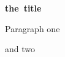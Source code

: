 \begin{examplewithcode}
\def\Header#1{\medskip
  \hbox{\bfseries #1}
  \setcounter{vcount}{1}
  }
\Header{the title}

Paragraph one

and two
\end{examplewithcode}
